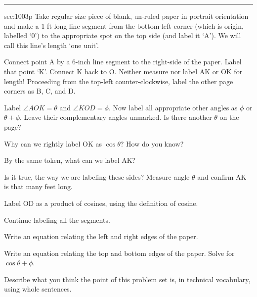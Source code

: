 \renewcommand{\columnseprule}{1.5pt}
\begin{multicols*}{2}
\rule[0.5\baselineskip]{0.4\textwidth}{1pt}
\noindent
{}\label{sec:1003p}
\begin{exercises}{sec:1003p}
\lab{} Take regular size piece of blank, un-ruled paper in portrait orientation and make a 1 ft-long line segment from the bottom-left corner (which is origin, labelled `0') to the appropriate spot on the top side (and label it `A').  We will call this line's length `one unit'.

\vspace{1cm}
\lab{} Connect point A by a 6-inch line segment to the right-side of the paper.  Label that point `K'.  Connect K back to O.  Neither measure nor label AK or OK for length!  Proceeding from the top-left counter-clockwise, label the other page corners as B, C, and D.

\vspace{1cm}
\lab{} Label $\angle AOK=\theta$ and $\angle KOD=\phi$.  Now label all appropriate other angles as $\phi$ or $\theta + \phi$.  Leave their complementary angles unmarked.  Is there another $\theta$ on the page?

\vspace{2cm}
\lab{}  Why can we rightly label OK as $\cos{\theta}$?  How do you know?

\vspace{2cm}
\lab{} By the same token, what can we label AK?

\vspace{3cm}
\lab{} Is it true, the way we are labeling these sides?  Measure angle $\theta$ and confirm AK is that many feet long.

\vspace{3cm}
\lab{}  Label OD as a product of cosines, using the definition of cosine.

\vspace{2cm}
\lab{} Continue labeling all the segments.

\vspace{1cm}
\lab{}  Write an equation relating the left and right edges of the paper.

\vspace{3cm}
\lab{}  Write an equation relating the top and bottom edges of the paper.  Solve for $\cos{\theta+ \phi}$.

\vspace{4cm}
\lab{} Describe what you think the point of this problem set is, in technical vocabulary, using whole sentences.
\end{exercises}
\end{multicols*}